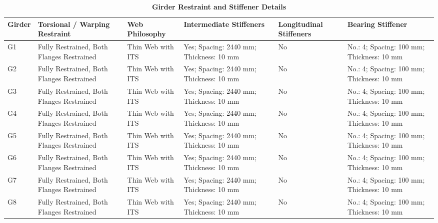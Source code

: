 \documentclass[12pt,a4paper]{report}
\numberwithin{table}{chapter}
\numberwithin{figure}{chapter}
\begin{document}
\vspace{4pt}
\begin{longtable}{|L{1.4cm}|p{2.2cm}|p{2.2cm}|p{3.0cm}|p{2.4cm}|p{2.2cm}|}
\caption{\textbf{Girder Restraint and Stiffener Details}}\\
\hline
\textbf{Girder} & \textbf{Torsional / Warping Restraint} & \textbf{Web Philosophy} & \textbf{Intermediate Stiffeners} & \textbf{Longitudinal Stiffeners} & \textbf{Bearing Stiffener} \\[6pt]
\hline
\endfirsthead
\endhead

G1 & Fully Restrained, Both Flanges Restrained & Thin Web with ITS & Yes; Spacing: 2440 mm; Thickness: 10 mm & No & No.: 4; Spacing: 100 mm; Thickness: 10 mm \\[8pt]
\hline
G2 & Fully Restrained, Both Flanges Restrained & Thin Web with ITS & Yes; Spacing: 2440 mm; Thickness: 10 mm & No & No.: 4; Spacing: 100 mm; Thickness: 10 mm \\[8pt]
\hline
G3 & Fully Restrained, Both Flanges Restrained & Thin Web with ITS & Yes; Spacing: 2440 mm; Thickness: 10 mm & No & No.: 4; Spacing: 100 mm; Thickness: 10 mm \\[8pt]
\hline
G4 & Fully Restrained, Both Flanges Restrained & Thin Web with ITS & Yes; Spacing: 2440 mm; Thickness: 10 mm & No & No.: 4; Spacing: 100 mm; Thickness: 10 mm \\[8pt]
\hline
G5 & Fully Restrained, Both Flanges Restrained & Thin Web with ITS & Yes; Spacing: 2440 mm; Thickness: 10 mm & No & No.: 4; Spacing: 100 mm; Thickness: 10 mm \\[8pt]
\hline
G6 & Fully Restrained, Both Flanges Restrained & Thin Web with ITS & Yes; Spacing: 2440 mm; Thickness: 10 mm & No & No.: 4; Spacing: 100 mm; Thickness: 10 mm \\[8pt]
\hline
G7 & Fully Restrained, Both Flanges Restrained & Thin Web with ITS & Yes; Spacing: 2440 mm; Thickness: 10 mm & No & No.: 4; Spacing: 100 mm; Thickness: 10 mm \\[8pt]
\hline
G8 & Fully Restrained, Both Flanges Restrained & Thin Web with ITS & Yes; Spacing: 2440 mm; Thickness: 10 mm & No & No.: 4; Spacing: 100 mm; Thickness: 10 mm \\[8pt]
\hline
\end{longtable}



\newpage

\vspace{0.4em}
\setlength{\tabcolsep}{4pt}
\setlength\LTleft{0pt}
\setlength\LTright{\fill}
\end{document}
